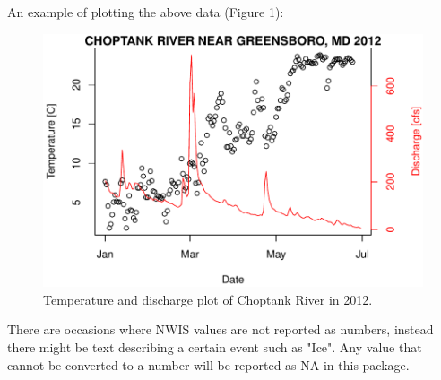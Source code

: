 \documentclass[a4paper,11pt]{article}
\begin{document}
An example of plotting the above data (Figure 1):

\begin{Schunk}
\end{Schunk}
\newpage

\begin{figure}
\begin{center}
\includegraphics{dataRetrieval-fig1}
\end{center}
\caption{Temperature and discharge plot of Choptank River in 2012.}
\end{figure}


There are occasions where NWIS values are not reported as numbers, instead there might be text describing a certain event such as "Ice".  Any value that cannot be converted to a number will be reported as NA in this package.


\end{document}
